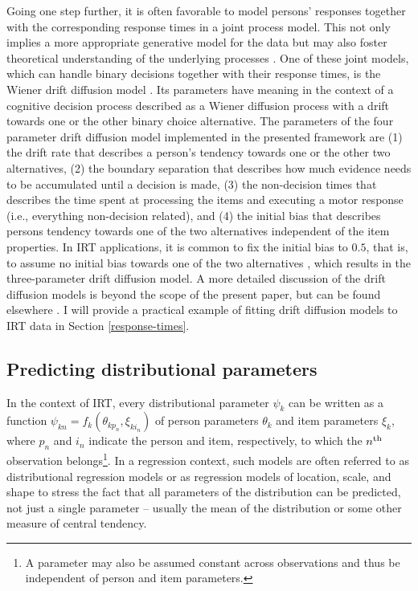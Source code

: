 \documentclass[
]{jss}
\begin{document}
Going one step further, it is often favorable to model persons'
responses together with the corresponding response times in a joint
process model. This not only implies a more appropriate generative model
for the data but may also foster theoretical understanding of the
underlying processes \citep{ratcliff1978, vandermaas2011}. One of these
joint models, which can handle binary decisions together with their
response times, is the Wiener drift diffusion model
\citep{ratcliff1978, vandermaas2011}. Its parameters have meaning in the
context of a cognitive decision process described as a Wiener diffusion
process with a drift towards one or the other binary choice alternative.
The parameters of the four parameter drift diffusion model implemented
in the presented framework are (1) the drift rate that describes a
person's tendency towards one or the other two alternatives, (2) the
boundary separation that describes how much evidence needs to be
accumulated until a decision is made, (3) the non-decision times that
describes the time spent at processing the items and executing a motor
response (i.e., everything non-decision related), and (4) the initial
bias that describes persons tendency towards one of the two alternatives
independent of the item properties. In IRT applications, it is common to
fix the initial bias to \(0.5\), that is, to assume no initial bias
towards one of the two alternatives \citep{diffIRT}, which results in
the three-parameter drift diffusion model. A more detailed discussion of
the drift diffusion models is beyond the scope of the present paper, but
can be found elsewhere \citep{ratcliff1978, vandermaas2011, diffIRT}. I
will provide a practical example of fitting drift diffusion models to
IRT data in Section \ref{response-times}.

\hypertarget{predDP}{%
\subsection{Predicting distributional parameters}\label{predDP}}

In the context of IRT, every distributional parameter \(\psi_k\) can be
written as a function \(\psi_{kn} = f_k(\theta_{kp_n}, \xi_{ki_n})\) of
person parameters \(\theta_{k}\) and item parameters \(\xi_{k}\), where
\(p_n\) and \(i_n\) indicate the person and item, respectively, to which
the \(n\textsuperscript{th}\) observation
belongs\footnote{A parameter may also be assumed constant across observations
and thus be independent of person and item parameters.}. In a regression
context, such models are often referred to as distributional regression
models or as regression models of location, scale, and shape
\citep{rigby2005} to stress the fact that all parameters of the
distribution can be predicted, not just a single parameter -- usually
the mean of the distribution or some other measure of central tendency.
\end{document}
